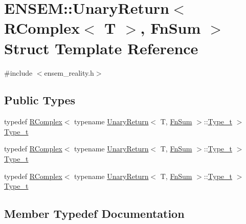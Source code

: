\hypertarget{structENSEM_1_1UnaryReturn_3_01RComplex_3_01T_01_4_00_01FnSum_01_4}{}\section{E\+N\+S\+EM\+:\+:Unary\+Return$<$ R\+Complex$<$ T $>$, Fn\+Sum $>$ Struct Template Reference}
\label{structENSEM_1_1UnaryReturn_3_01RComplex_3_01T_01_4_00_01FnSum_01_4}


{\ttfamily \#include $<$ensem\+\_\+reality.\+h$>$}

\subsection*{Public Types}
\begin{DoxyCompactItemize}
\item 
typedef \mbox{\hyperlink{classENSEM_1_1RComplex}{R\+Complex}}$<$ typename \mbox{\hyperlink{structENSEM_1_1UnaryReturn}{Unary\+Return}}$<$ T, \mbox{\hyperlink{structENSEM_1_1FnSum}{Fn\+Sum}} $>$\+::\mbox{\hyperlink{structENSEM_1_1UnaryReturn_3_01RComplex_3_01T_01_4_00_01FnSum_01_4_a466a9eef64139dc94681a73722d48328}{Type\+\_\+t}} $>$ \mbox{\hyperlink{structENSEM_1_1UnaryReturn_3_01RComplex_3_01T_01_4_00_01FnSum_01_4_a466a9eef64139dc94681a73722d48328}{Type\+\_\+t}}
\item 
typedef \mbox{\hyperlink{classENSEM_1_1RComplex}{R\+Complex}}$<$ typename \mbox{\hyperlink{structENSEM_1_1UnaryReturn}{Unary\+Return}}$<$ T, \mbox{\hyperlink{structENSEM_1_1FnSum}{Fn\+Sum}} $>$\+::\mbox{\hyperlink{structENSEM_1_1UnaryReturn_3_01RComplex_3_01T_01_4_00_01FnSum_01_4_a466a9eef64139dc94681a73722d48328}{Type\+\_\+t}} $>$ \mbox{\hyperlink{structENSEM_1_1UnaryReturn_3_01RComplex_3_01T_01_4_00_01FnSum_01_4_a466a9eef64139dc94681a73722d48328}{Type\+\_\+t}}
\item 
typedef \mbox{\hyperlink{classENSEM_1_1RComplex}{R\+Complex}}$<$ typename \mbox{\hyperlink{structENSEM_1_1UnaryReturn}{Unary\+Return}}$<$ T, \mbox{\hyperlink{structENSEM_1_1FnSum}{Fn\+Sum}} $>$\+::\mbox{\hyperlink{structENSEM_1_1UnaryReturn_3_01RComplex_3_01T_01_4_00_01FnSum_01_4_a466a9eef64139dc94681a73722d48328}{Type\+\_\+t}} $>$ \mbox{\hyperlink{structENSEM_1_1UnaryReturn_3_01RComplex_3_01T_01_4_00_01FnSum_01_4_a466a9eef64139dc94681a73722d48328}{Type\+\_\+t}}
\end{DoxyCompactItemize}


\subsection{Member Typedef Documentation}
\mbox{\label{structENSEM_1_1UnaryReturn_3_01RComplex_3_01T_01_4_00_01FnSum_01_4_a466a9eef64139dc94681a73722d48328}} 
